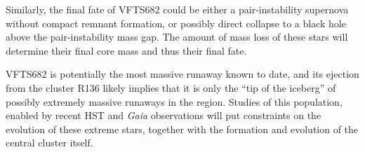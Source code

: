 \documentclass[a4paper,fleqn,usenatbib]{mnras}
\begin{document}
Similarly, the final fate of VFTS682 could be either a
pair-instability supernova without compact remnant formation, or
possibly direct collapse to a black hole above the pair-instability
mass gap. The amount of mass loss of these stars will determine their final core
mass and thus their final fate.

VFTS682 is potentially the most massive runaway known to date, and its ejection
from the cluster R136 likely implies that it is only the ``tip of the
iceberg'' of possibly extremely massive runaways in the
region. Studies of this population, enabled by recent HST and \emph{Gaia} observations will put constraints on the evolution
of these extreme stars, together with the formation and evolution of
the central cluster itself.





\bsp	%
\label{lastpage}


\end{document}
